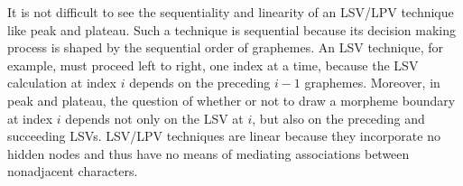 {It is not difficult to see the sequentiality and linearity of an LSV/LPV technique like peak and plateau.
Such a technique is sequential because its decision making process is shaped by the sequential order of graphemes.
An LSV technique, for example, must proceed left to right, one index at a time, because the LSV calculation at index $i$ depends on the preceding $i-1$ graphemes. Moreover, in peak and plateau, the question of whether or not to draw a morpheme boundary at index $i$ depends not only on the LSV at $i$, but also on the preceding and succeeding LSVs. LSV/LPV techniques are linear because they incorporate no hidden nodes and thus have no means of mediating associations between nonadjacent characters.
%

}
